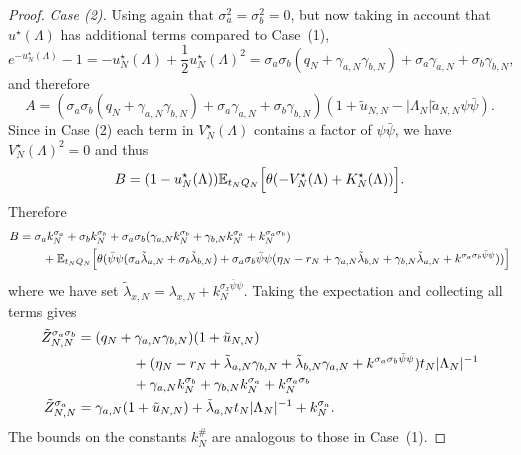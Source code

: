 \documentclass[11pt]{amsart}
\numberwithin{equation}{section}
\numberwithin{theorem}{section}
\newcommand{\1}{{\bf 1}}
\newcommand{\obs}{\star}
\newcommand{\Vobs}{V^\obs}
\newcommand{\Kobs}{K^\obs}
\begin{document}
\begin{proof}
  \medskip
  \noindent\emph{Case (2).}
  Using again that $\sigma_a^2=\sigma_b^2=0$, but now taking in account that $u^\obs(\Lambda)$ has additional terms compared to Case~(1),
  \begin{equation}
    e^{-u_N^\obs(\Lambda)}-1=
    -u^\obs_N(\Lambda)+\frac12 u^\obs_N(\Lambda)^2 = \sigma_a\sigma_b (q_N+\gamma_{a,N}\gamma_{b,N}) + \sigma_a \gamma_{a,N} +\sigma_b\gamma_{b,N},
  \end{equation}
  and therefore
  \begin{equation}
    A =(\sigma_a\sigma_b(q_N+\gamma_{a,N}\gamma_{b,N})+\sigma_a \gamma_{a,N}+\sigma_b\gamma_{b,N})
    (1 + \tilde u_{N,N} - |\Lambda_N|\tilde a_{N,N} \psi\bar\psi)
    .
  \end{equation}
  Since in Case (2) each term in $\Vobs_N(\Lambda)$ contains a factor of $\psi\bar\psi$,
  we have $\Vobs_N(\Lambda)^2=0$ 
  and thus
  \begin{equation}
    B = (1-u_N^\obs(\Lambda))\E_{t_NQ_N}\qB{\theta(-\Vobs_N(\Lambda)+\Kobs_N(\Lambda))}.
  \end{equation}
  Therefore
   \begin{align}
     B&=         \sigma_a k_N^{\sigma_a}
     +
     \sigma_b k_N^{\sigma_b}
     +\sigma_a\sigma_b (\gamma_{a,N} k_N^{\sigma_b} + \gamma_{b,N} k_N^{\sigma_a} + k_N^{\sigma_a\sigma_b})
     \nonumber\\
      &\qquad+
      \mathbb{E}_{t_NQ_N}\Bigl[{ \theta({\bar\psi\psi
        (\sigma_{a}\tilde\lambda_{a,N} +
        \sigma_{b}\tilde\lambda_{b,N}) 
     + \sigma_a \sigma_b\bar\psi\psi (\eta_N - r_N    +
     \gamma_{a,N}\tilde\lambda_{b,N}+\gamma_{b,N}\tilde\lambda_{a,N} + k^{\sigma_a\sigma_b\bar\psi\psi})})}\Bigr]
  \end{align}
  where we have set
  $\tilde\lambda_{x,N} = \lambda_{x,N} + k_N^{\sigma_x\bar\psi\psi}$.
  Taking the expectation and collecting all terms gives
  \begin{align}
    \tilde Z_{N,N}^{\sigma_a\sigma_b}
    &= (q_N+\gamma_{a,N}\gamma_{b,N}) (1+\tilde u_{N,N})
      \nonumber\\
    &\qquad\qquad + (\eta_N - r_N +\tilde\lambda_{a,N}\gamma_{b,N}+\tilde\lambda_{b,N}\gamma_{a,N} + k^{\sigma_a\sigma_b\bar\psi\psi})t_N|\Lambda_N|^{-1}
      \nonumber\\
      &\qquad\qquad
      +\gamma_{a,N} k_N^{\sigma_b} + \gamma_{b,N} k_N^{\sigma_a} + k_N^{\sigma_a\sigma_b}
    \\
    \tilde Z_{N,N}^{\sigma_a}
    &=
      \gamma_{a,N} (1+\tilde u_{N,N}) + \tilde\lambda_{a,N}t_N|\Lambda_N|^{-1}
      +    k_N^{\sigma_a}
      .
  \end{align}
  The bounds on the constants $k_N^\#$ are analogous to those in Case~(1).
\end{proof}
\end{document}
